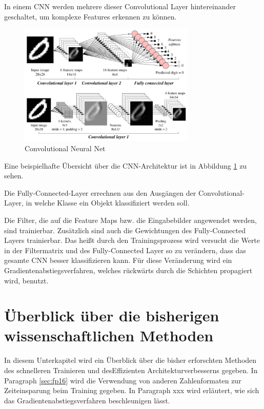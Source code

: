 In einem CNN werden mehrere dieser Convolutional Layer hintereinander geschaltet, um komplexe Features erkennen zu können. 
\begin{figure}[H]
  \centering
  \includegraphics[width=0.75\textwidth]{images/cnn.pdf}
  \caption{Convolutional Neural Net \cite{CNNImg}}
  \label{fig:cnn}
\end{figure}



Eine beispielhafte Übersicht über die CNN-Architektur ist in Abbildung \ref{fig:cnn} zu sehen.

Die Fully-Connected-Layer errechnen aus den Ausgängen der Convolutional-Layer, in welche Klasse ein Objekt klassifiziert werden soll.  

Die Filter, die auf die Feature Maps bzw. die Eingabebilder angewendet werden, sind trainierbar. Zusätzlich sind auch die Gewichtungen des Fully-Connected Layers trainierbar. Das heißt durch den Trainingsprozess wird versucht die Werte in der Filtermatrix und des Fully-Connected Layer so zu verändern, dass das gesamte CNN besser klassifizieren kann. Für diese Veränderung wird ein Gradientenabstiegsverfahren, welches rückwärts durch die Schichten propagiert wird, benutzt.



\section{Überblick über die bisherigen wissenschaftlichen Methoden}
In diesem Unterkapitel wird ein Überblick über die bisher erforschten Methoden des schnelleren Trainieren und desEffizienten Architekturverbesserns gegeben. In Paragraph \ref{sec:fp16} wird die Verwendung von anderen Zahlenformaten zur Zeiteinsparung beim Training gegeben. In Paragraph xxx wird erläutert, wie sich das Gradientenabstiegsverfahren beschleunigen lässt. 
